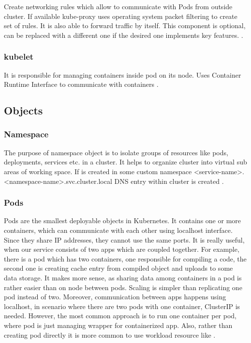 Create networking rules which allow to communicate with Pods from outside cluster. If available kube-proxy uses operating system packet filtering to create set of rules. It is also able to forward traffic by itself. This component is optional, can be replaced with a different one if the desired one implements key features. \cite{KubernetesArch}.


\subsubsection{kubelet}
\label{sec:kubelet}

It is responsible for managing containers inside pod on its node. Uses Container Runtime Interface to communicate with containers \cite{KubernetesArch} \cite{KubernetesCRI}.


\subsection{Objects}    
\label{sec:k8s_objects}

\subsubsection{Namespace}
\label{sec:namespace}

The purpose of namespace object is to isolate groups of resources like pods, deployments, services etc. in a cluster. It helps to organize cluster into virtual sub areas of working space. If \textit{} is created in some custom namespace <service-name>.<namespace-name>.svc.cluster.local DNS entry within cluster is created \cite{KubernetesNamespaces}.

\subsubsection{Pods}
\label{sec:pods}

Pods are the smallest deployable objects in Kubernetes. It contains one or more containers, which can communicate with each other using localhost interface. Since they share IP addresses, they cannot use the same ports. It is really useful, when our service consists of two apps which are coupled together. For example, there is a pod which has two containers, one responsible for compiling a code, the second one is creating cache entry from compiled object and uploads to some data storage. It makes more sense, as sharing data among containers in a pod is rather easier than on node between pods. Scaling is simpler than replicating one pod instead of two. Moreover, communication between apps happens using localhost, in scenario where there are two pods with one container, ClusterIP \textit{} is needed. However, the most common approach is to run one container per pod, where pod is just managing wrapper for containerized app. Also, rather than creating pod directly it is more common to use workload resource like \textit{} \cite{KubernetesPods}. 



